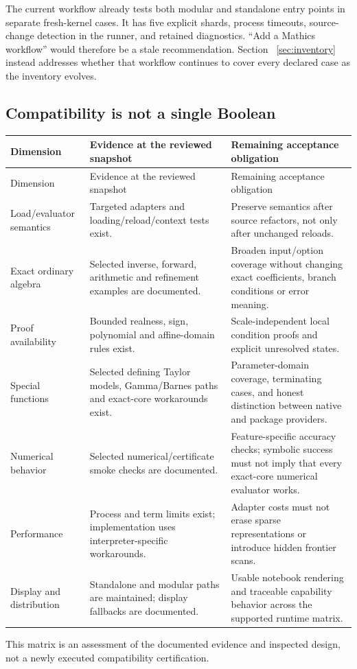 \documentclass[11pt,letterpaper]{article}
\begin{document}
The current workflow already tests both modular and standalone entry points
in separate fresh-kernel cases. It has five explicit shards, process timeouts,
source-change detection in the runner, and retained diagnostics. ``Add a
Mathics workflow'' would therefore be a stale recommendation. Section~
\ref{sec:inventory} instead addresses whether that workflow continues to
cover every declared case as the inventory evolves.
\cite{repo-workflow,repo-runner}

\subsection{Compatibility is not a single Boolean}
\small
\begin{longtable}{P{0.22\textwidth}P{0.35\textwidth}P{0.34\textwidth}}
\toprule
Dimension & Evidence at the reviewed snapshot & Remaining acceptance obligation\\
\midrule
\endfirsthead
\toprule Dimension & Evidence at the reviewed snapshot & Remaining acceptance obligation\\\midrule
\endhead
Load/evaluator semantics & Targeted adapters and loading/reload/context tests exist. & Preserve semantics after source refactors, not only after unchanged reloads.\\
Exact ordinary algebra & Selected inverse, forward, arithmetic and refinement examples are documented. & Broaden input/option coverage without changing exact coefficients, branch conditions or error meaning.\\
Proof availability & Bounded realness, sign, polynomial and affine-domain rules exist. & Scale-independent local condition proofs and explicit unresolved states.\\
Special functions & Selected defining Taylor models, Gamma/Barnes paths and exact-core workarounds exist. & Parameter-domain coverage, terminating cases, and honest distinction between native and package providers.\\
Numerical behavior & Selected numerical/certificate smoke checks are documented. & Feature-specific accuracy checks; symbolic success must not imply that every exact-core numerical evaluator works.\\
Performance & Process and term limits exist; implementation uses interpreter-specific workarounds. & Adapter costs must not erase sparse representations or introduce hidden frontier scans.\\
Display and distribution & Standalone and modular paths are maintained; display fallbacks are documented. & Usable notebook rendering and traceable capability behavior across the supported runtime matrix.\\
\bottomrule
\end{longtable}
\normalsize
This matrix is an assessment of the documented evidence and inspected design,
not a newly executed compatibility certification. \cite{repo-mathics}
\end{document}
